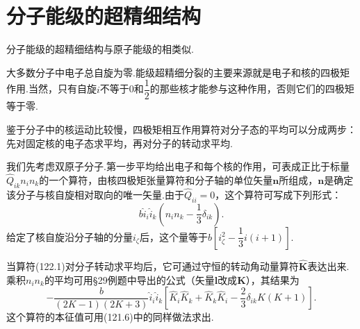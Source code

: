 \section{分子能级的超精细结构}

分子能级的超精细结构与原子能级的相类似.

大多数分子中电子总自旋为零.能级超精细分裂的主要来源就是电子和核的四极矩作用.当然，只有自旋$i$不等于0和$\dfrac{1}{2}$的那些核才能参与这种作用，否则它们的四极矩等于零.

鉴于分子中的核运动比较慢，四极矩相互作用算符对分子态的平均可以分成两步：先对固定核的电子态求平均，再对分子的转动求平均.

我们先考虑双原子分子.第一步平均给出电子和每个核的作用，可表成正比于标量$\hat{Q}_{ik}n_in_k$的一个算符，由核四极矩张量算符和分子轴的单位矢量$\boldsymbol{n}$所组成，$\boldsymbol{n}$是确定该分子与核自旋相对取向的唯一矢量.由于$\hat{Q}_{ii}=0$，这个算符可写成下列形式：
\begin{equation}
  b\hat{i}_i\hat{i}_k\left(n_in_k-\frac{1}{3}\delta_{ik}\right).
\end{equation}
给定了核自旋沿分子轴的分量$i_\zeta$后，这个量等于$b\left[i_\zeta^2-\dfrac{1}{3}i(i+1)\right]$.

当算符(122.1)对分子转动求平均后，它可通过守恒的转动角动量算符$\hat{\boldsymbol{K}}$表达出来.乘积$n_in_k$的平均可用§29例题中导出的公式（矢量$\boldsymbol{l}$改成$\boldsymbol{K}$），其结果为
\begin{equation}
  -\frac{b}{(2K-1)(2K+3)}\hat{i}_i\hat{i}_k
  \left[\hat{K}_i\hat{K}_k+\hat{K}_k\hat{K}_i
  -\frac{2}{3}\delta_{ik}K(K+1)\right].
\end{equation}
这个算符的本征值可用(121.6)中的同样做法求出.

